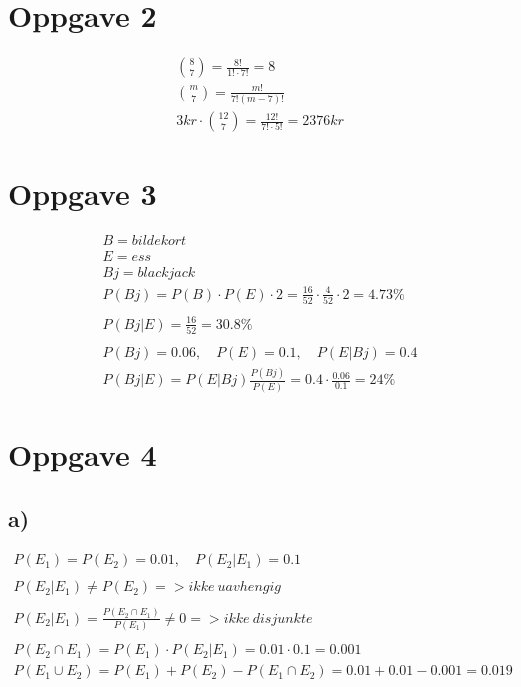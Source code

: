\section*{Oppgave 2}

\begin{gather*}
	\binom{8}{7} = \frac{8!}{1! \cdot 7!} = 8 \\
	\binom{m}{7} = \frac{m!}{7! (m - 7)!} \\
	3 kr \cdot \binom{12}{7} = \frac{12!}{7! \cdot 5!} = 2 376 kr
\end{gather*}


\section*{Oppgave 3}

\begin{gather*}
	B = bildekort \\
	E = ess \\
	Bj = blackjack \\
	P(Bj) = P(B) \cdot P(E) \cdot 2 =
	\frac{16}{52} \cdot \frac{4}{52} \cdot 2 = 4.73\% \\ \\
	P(Bj | E) = \frac{16}{52} = 30.8\% \\ \\
	P(Bj) = 0.06, \quad
	P(E) = 0.1, \quad
	P(E | Bj) = 0.4 \\
	P(Bj | E) = P(E | Bj) \frac{P(Bj)}{P(E)} = 0.4 \cdot \frac{0.06}{0.1} =
	24 \%
\end{gather*}


\newpage


\section*{Oppgave 4}

\subsection*{a)}

\begin{gather*}
	P(E_1) = P(E_2) = 0.01, \quad
	P(E_2 | E_1) = 0.1 \\ \\
	P(E_2 | E_1) \neq P(E_2) => ikke\ uavhengig \\ \\
	P(E_2 | E_1) = \frac{P(E_2 \cap E_1)}{P(E_1)} \neq 0 => ikke\ disjunkte \\ \\
	P(E_2 \cap E_1) = P(E_1) \cdot P(E_2 | E_1) =
	0.01 \cdot 0.1 = 0.001 \\
	P(E_1 \cup E_2) = P(E_1) + P(E_2) - P(E_1 \cap E_2) =
	0.01 + 0.01 - 0.001 = 0.019
\end{gather*}

